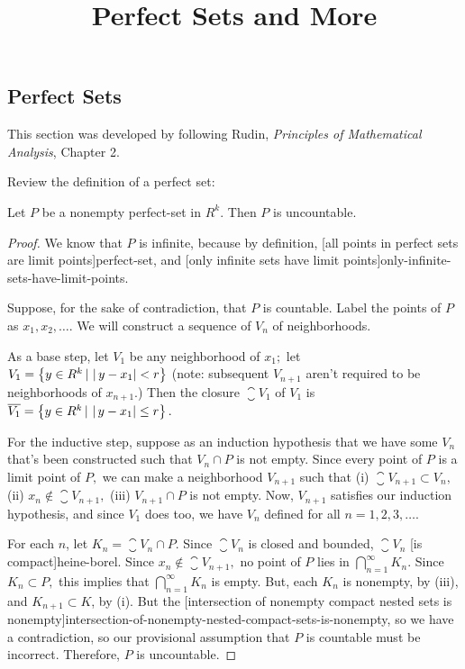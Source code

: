 \documentclass{article}
\title{Perfect Sets and More}
\begin{document}
\subsection{Perfect Sets}

\begin{note}\label{perfect-sets-reference-note}
This section was developed by following Rudin, \emph{Principles of Mathematical Analysis}, Chapter 2.
\end{note}

Review the definition of a perfect set:


\begin{theorem}\label{non-empty-perfect-sets-in-rk-are-uncountable}
Let $P$ be a nonempty \@{perfect-set} in $R^k.$ Then $P$ is \@{uncountable}.
\end{theorem}

\begin{proof}
We know that $P$ is infinite, because by definition, \@[all points in perfect sets are limit points]{perfect-set}, and \@[only infinite sets have limit points]{only-infinite-sets-have-limit-points}.

Suppose, for the sake of contradiction, that $P$ is \@{countable}. Label the points of $P$ as $x_1, x_2, \dots.$ We will construct a \@{sequence} of ${V_n}$ of \@{neighborhoods}.

As a base step, let $V_1$ be any neighborhood of $x_1;$ let $V_1 = \left\{ y \in R^k \left| ~ \right|y - x_1| < r \right\}$ (note: subsequent $V_{n+1}$ aren't required to be neighborhoods of $x_{n+1}.$) Then the \@{closure} $\closure{V_1}$ of $V_1$ is $\overline{V_1} =  \left\{ y \in R^k \left| ~ \right|y - x_1| \leq r \right\}.$

For the inductive step, suppose as an induction hypothesis that we have some $V_n$ that's been constructed such that $V_n \cap P$ is not empty. Since every point of $P$ is a limit point of $P,$ we can make a neighborhood $V_{n+1}$ such that (i) $\closure{V_{n+1}} \subset V_n,$ (ii) $x_n \notin \closure{V_{n+1}},$ (iii) $V_{n+1} \cap P$ is not empty. Now, $V_{n+1}$ satisfies our induction hypothesis, and since $V_1$ does too, we have ${V_n}$ defined for all $n = 1, 2, 3, \dots.$

For each $n$, let $K_n = \closure{V_n} \cap P.$ Since $\closure{V_n}$ is \@{closed} and \@{bounded}, $\closure{V_n}$ \@[is compact]{heine-borel}. Since $x_n \notin \closure{V_{n+1}},$ no point of $P$ lies in $\bigcap_{n=1}^\infty K_n.$ Since $K_n \subset P,$ this implies that $\bigcap_{n=1}^\infty K_n$ is empty. But, each $K_n$ is nonempty, by (iii), and $K_{n+1} \subset K$, by (i). But the \@[intersection of nonempty compact nested sets is nonempty]{intersection-of-nonempty-nested-compact-sets-is-nonempty}, so we have a contradiction, so our provisional assumption that $P$ is countable must be incorrect. Therefore, $P$ is \@{uncountable}.
\end{proof}
\end{document}
